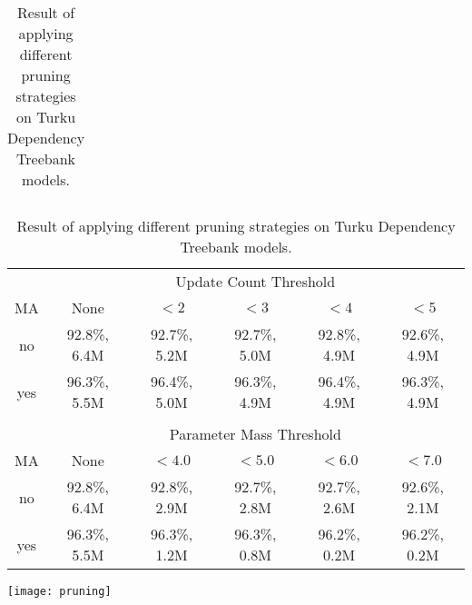 \begin{table}[htb!]
\begin{center}
\begin{tabular}{c|ccccc}

\end{tabular}
\caption{Result of applying different pruning strategies on Turku Dependency Treebank models.}
\end{center}
\end{table}

\begin{table}[htb!]
\begin{center}
\begin{tabular}{c|ccccc}
\multicolumn{1}{c}{}                       & \multicolumn{5}{c}{Update Count Threshold}\\
MA                     & None            & $< 2$        & $< 3$        & $< 4$        & $< 5$       \\
\hline
no                     & 92.8\%, 6.4M    & 92.7\%, 5.2M & 92.7\%, 5.0M & 92.8\%, 4.9M & 92.6\%, 4.9M \\
yes                    & 96.3\%, 5.5M    & 96.4\%, 5.0M & 96.3\%, 4.9M & 96.4\%, 4.9M & 96.3\%, 4.9M \\
                       &                 &              &              &              &              \\
\multicolumn{1}{c}{}     & \multicolumn{5}{c}{Parameter Mass Threshold}\\
MA                     & None           & $< 4.0$        & $< 5.0$      & $< 6.0$      & $< 7.0$     \\
\hline
no                     & 92.8\%, 6.4M   & 92.8\%, 2.9M   & 92.7\%, 2.8M & 92.7\%, 2.6M & 92.6\%, 2.1M \\
yes                    & 96.3\%, 5.5M   & 96.3\%, 1.2M   & 96.3\%, 0.8M & 96.2\%, 0.2M & 96.2\%, 0.2M \\
\end{tabular}
\caption{Result of applying different pruning strategies on Turku Dependency Treebank models.}
\end{center}
\end{table}

\begin{table}[htb!]
\begin{center}
\texttt{[image: pruning]}
\end{center}
\end{table}



